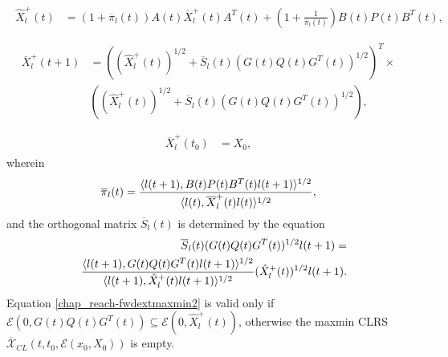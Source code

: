 \documentclass[letterpaper,10pt,english]{sphinxmanual}
\begin{document}
\label{chap_reach:equation-fwdextmaxmin1}\begin{gather}
\begin{split}\hat{X}^+_l(t) & = (1+\overline{\pi}_l(t))A(t)\overline{X}^+_l(t)A^T(t) +
\left(1+\frac{1}{\overline{\pi}_l(t)}\right)
B(t)P(t)B^T(t),  \\\end{split}\label{chap_reach-fwdextmaxmin1}
\end{gather}\label{chap_reach:equation-fwdextmaxmin2}\begin{gather}
\begin{split}\overline{X}^+_l(t+1) & = \left((\hat{X}^+_l(t))^{1/2} +
\overline{S}_l(t)(G(t)Q(t)G^T(t))^{1/2}\right)^T
\times \nonumber \\
& \left((\hat{X}^+_l(t))^{1/2} + \overline{S}_l(t)(G(t)Q(t)G^T(t))^{1/2}\right),\\\end{split}\label{chap_reach-fwdextmaxmin2}
\end{gather}\label{chap_reach:equation-fwdextmaxmin3}\begin{gather}
\begin{split}\overline{X}^+_l(t_0) & = X_0,\end{split}\label{chap_reach-fwdextmaxmin3}
\end{gather}
wherein
\begin{gather}
\begin{split}\overline{\pi}_l(t) = \frac{\langle l(t+1),
B(t)P(t)B^T(t)l(t+1)\rangle^{1/2}}{\langle l(t),
\overline{X}^+_l(t)l(t)\rangle^{1/2}},\end{split}\notag
\end{gather}
and the orthogonal matrix \(\overline{S}_l(t)\) is determined by
the equation
\begin{gather}
\begin{split}\begin{aligned}
& & \overline{S}_l(t)(G(t)Q(t)G^T(t))^{1/2}l(t+1) = \\
& & \frac{\langle l(t+1),
G(t)Q(t)G^T(t)l(t+1)\rangle^{1/2}}{\langle l(t+1),
\hat{X}^+_l(t)l(t+1)\rangle^{1/2}}(\hat{X}^+_l(t))^{1/2}l(t+1).\end{aligned}\end{split}\notag
\end{gather}
Equation \eqref{chap_reach-fwdextmaxmin2} is valid only if
\({\mathcal E}(0,G(t)Q(t)G^T(t))\subseteq{\mathcal E}(0,\hat{X}^+_l(t))\),
otherwise the maxmin CLRS
\(\overline{{\mathcal X}}_{CL}(t,t_0,{\mathcal E}(x_0,X_0))\) is
empty.
\end{document}
